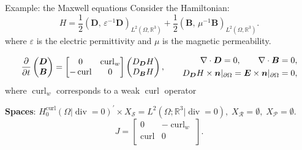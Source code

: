 \documentclass[aspectratio=169]{beamer}
\renewcommand{\div}{\operatorname{div}}
\DeclareMathOperator*{\curl}{curl}
\newcommand{\bbR}{\mathbb{R}}
\newcommand{\inpr}[3][]{\ensuremath{( #2, \, #3 )_{#1}}}
\begin{document}
\begin{frame}{Example: the Maxwell equations}
	Consider the Hamiltonian:
	\begin{equation*}
		{H} = \frac{1}{2} \inpr[L^2(\Omega, \bbR^3)]{\bm{D}}{\varepsilon^{-1}\bm{D}} + \frac{1}{2} \inpr[L^2(\Omega, \bbR^3)]{\bm{B}}{\mu^{-1}\bm{B}}.
	\end{equation*}
where  $\varepsilon$ is the electric permittivity and $\mu$ is the magnetic permeability.\\
\vspace{.3cm}
\begin{tcolorbox}[nobeforeafter, colframe=theme,title=The Maxwell equation on $\Omega \subset \bbR^3$ with conducting boundary condition]%
	\begin{equation*}
		\diffp{}{t}\begin{pmatrix}
			\bm{D} \\ \bm{B} 
		\end{pmatrix} = 
		\begin{bmatrix}
			0 & \curl_w \\
			-\curl & 0 \\
		\end{bmatrix}
		\begin{pmatrix}
			D_{\bm{D}}{H} \\
			D_{\bm{B}}{H} \\
		\end{pmatrix},\qquad 
	\begin{aligned}
		\nabla \cdot \bm{D}= 0, \qquad	\nabla \cdot \bm{B}= 0, \\
			D_{\bm{D}}{H} \times \bm{n}|_{\partial\Omega}= \bm{E} \times \bm{n}|_{\partial\Omega}=0,
	\end{aligned}
	\end{equation*}
	where $\curl_w$ corresponds to a weak $\curl$ operator

	\textbf{Spaces}: $H^{\curl}_0(\Omega| \div=0)^{'} \times X_{\mathcal{S}}= L^2(\Omega; \bbR^3|\div=0), \; X_{\mathcal{R}} = \emptyset, \; X_{\mathcal{P}}= \emptyset$. 
	\begin{equation*}
		J = \begin{bmatrix}
			0 & -\curl_w \\
			\curl & 0 \\
		\end{bmatrix}.
	\end{equation*}
\end{tcolorbox} 

	
	
\end{frame}
\end{document}
